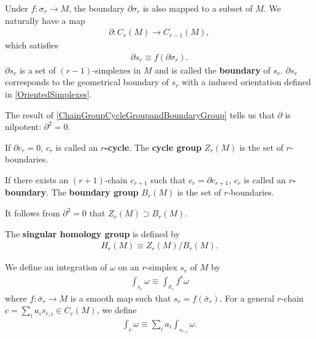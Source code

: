 \documentclass[10pt]{article}
\begin{document}
Under $f:\sigma_r\to M$, the boundary $\partial\sigma_r$ is also mapped to a subset of $M$.
We naturally have a map
\begin{align}
    \partial:C_r(M)\to C_{r-1}(M),
\end{align}
which satisfies
\begin{align}
    \partial s_r\equiv f(\partial \sigma_r).
\end{align}
$\partial s_r$ is a set of $(r-1)$-simplexes in $M$ and is called the \textbf{boundary} of $s_r$.
$\partial s_r$ corresponds to the geometrical boundary of $s_r$ with a induced orientation defined in \cref{OrientedSimplexes}.
\begin{property}
    The result of \cref{ChainGroupCycleGroupandBoundaryGroup} tells us that $\partial$ is nilpotent: $\partial^2=0$.
\end{property}

\begin{definition}
    If $\partial c_r=0$, $c_r$ is called an \textbf{$r$-cycle}.
    The \textbf{cycle group} $Z_r(M)$ is the set of $r$-boundaries.
\end{definition}
\begin{definition}
    If there exists an $(r+1)$-chain $c_{r+1}$ such that $c_r=\partial c_{r+1}$, $c_r$ is called an \textbf{$r$-boundary}.
    The \textbf{boundary group} $B_r(M)$ is the set of $r$-boundaries.
\end{definition}
It follows from $\partial^2=0$ that $Z_r(M)\supset B_r(M)$.
\begin{definition}
    The \textbf{singular homology group} is defined by
    \begin{align}
        H_r(M)\equiv Z_r(M)/B_r(M).
    \end{align}
\end{definition}

\begin{definition}
    We define an integration of $\omega$ on an $r$-simplex $s_r$ of $M$ by
    \begin{align}
        \int_{s_r}\omega\equiv\int_{\bar{\sigma}_r}f^*\omega
    \end{align}
    where $f:\bar{\sigma}_r\to M$ is a smooth map such that $s_r=f(\bar{\sigma}_r)$.
    For a general $r$-chain $c=\sum_i a_i s_{r,i}\in C_r(M)$, we define
    \begin{align}
        \int_c\omega\equiv\sum_i a_i \int_{s_{r,i}}\omega.
    \end{align}
\end{definition}
\end{document}
